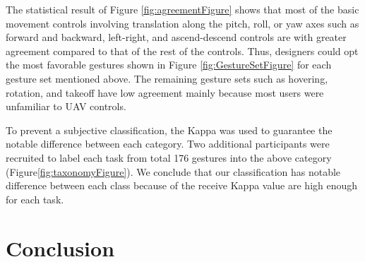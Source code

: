 \documentclass{sigchi}
\begin{document}
The statistical result of Figure \ref{fig:agreementFigure} shows that most of the basic movement controls involving translation along the pitch, roll, or yaw axes such as forward and backward, left-right, and ascend-descend controls are with greater agreement compared to that of the rest of the controls. Thus, designers could opt the most favorable gestures shown in Figure \ref{fig:GestureSetFigure} for each gesture set mentioned above. The remaining gesture sets such as hovering, rotation, and takeoff have low agreement mainly because most users were unfamiliar to UAV controls.

To prevent a subjective classification, the Kappa was used to guarantee the notable difference between each category. Two additional participants were recruited to label each task from total 176 gestures into the above category (Figure\ref{fig:taxonomyFigure}). We conclude that our classification has notable difference between each class because of the receive Kappa value are high enough for each task.







\section{Conclusion}
\end{document}
